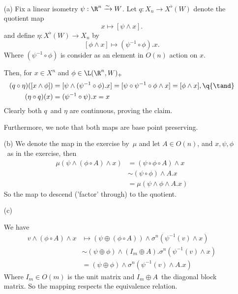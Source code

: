 \begin{exercise}[2]\ 
\begin{enumerate}
\item[(a)]
Fix a linear isometry $\psi: \R^n \simto W$. Let 
$q : X_n \to X^\flat(W)$ denote the quotient map 
\[ x \mapsto [\psi \wedge x]. \]
and define $\eta: X^\flat(W) \to X_n$ by 
\[ [\phi \wedge x] \mapsto (\psi^{-1} \circ \phi) . x. \]
Where $(\psi^{-1} \circ \phi)$ is consider as an element in $O(n)$ action on
$x$.

Then, for $x \in X^n$ and $\phi \in \L(\R^n, W)_+$ 
\begin{align*}
(q \circ \eta) ([x \wedge \phi]) 
&= [\psi \wedge (\psi^{-1} \circ \phi) . x ] 
= [\psi \circ \psi^{-1} \circ \phi \wedge x]
= [\phi \wedge x], \q{\tand} \\
(\eta \circ q) (x) 
&= (\psi^{-1} \circ \psi) . x 
= x
\end{align*}
Clearly both $q$ and $\eta$ are continuous, proving the claim.

Furthermore, we note that both maps are base point preserving.

\item[(b)]
We denote the map in the exercise by $\mu$ and
let $A \in O(n)$, and $x, \psi, \phi$ as in the exercise, then 
\begin{align*}
\mu( \psi \wedge (\phi \circ A) \wedge x ) 
&= (\psi \circ \phi \circ A) \wedge x  \\
&\sim (\psi \circ \phi) \wedge A . x \\
&= \mu( \psi \wedge \phi \wedge A . x ) 
\end{align*}
So the map to descend ('factor' through) to the quotient. 

\item[(c)]

We have 
\begin{align*}
v \wedge (\phi \circ A) \wedge x 
&\mapsto (\psi \oplus (\phi \circ A)) \wedge \sigma^n(\psi^{-1}(v) \wedge x) \\
&\sim (\psi \oplus \phi) \wedge (I_m\oplus A) . \sigma^n (\psi^{-1}(v) \wedge x)
\\
&= (\psi \oplus \phi) \wedge \sigma^n (\psi^{-1}(v) \wedge A.x)
\end{align*}
Where $I_m \in O(m)$ is the unit matrix and $I_m\oplus A$ the diagonal block
matrix. So the mapping respects the equivalence relation. 


\end{enumerate}
\end{exercise}
